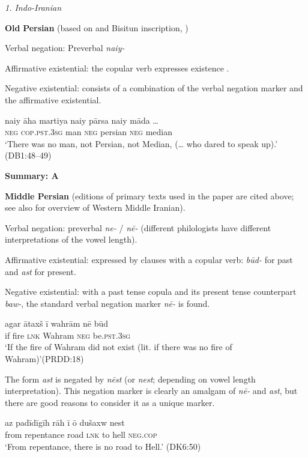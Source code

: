 ﻿\documentclass[output=paper]{langsci/langscibook}
\begin{document}
\begin{unindented}
\textit{1. Indo-Iranian}

\textbf{Old} \textbf{Persian} (based on \citealt{Skjarvo2009b} and Bisitun inscription, \citealt{Schmitt1991})

Verbal negation: Preverbal \textit{naiy-}

Affirmative existential: the copular verb expresses existence \citep[134]{Skjærvø2009b}.

Negative existential: consists of a combination of the verbal negation
marker and the affirmative existential.
%
\begin{exe}\ex
    \gll naiy āha martiya   naiy  pārsa   naiy māda … \\
\textsc{neg} \textsc{cop.pst.3sg} man \textsc{neg} persian  \textsc{neg} median \\
    \glt `There was no man, not Persian, not Median, (… who dared to speak up).' (DB1:48--49)
    \end{exe}
%
\textbf{Summary: A}

\textbf{Middle Persian} (editions of primary texts used in the paper are cited above; see also \citet{Skjærvø2009a} for overview of Western Middle Iranian).

Verbal negation: preverbal \textit{ne-} / \textit{nē-} (different philologists have different interpretations of the vowel length). 

Affirmative existential: expressed by clauses with a copular verb: \textit{būd-} for past and \textit{ast} for present.

Negative existential: with a past tense copula and its present tense counterpart \textit{baw-}, the standard verbal negation marker \textit{nē-} is found.
%
\begin{exe}\ex
    \gll agar ātaxš ī        wahrām  nē     būd \\
if      fire    \textsc{lnk}   Wahram \textsc{neg}  be.\textsc{pst.3sg} \\
    \glt `If the fire of Wahram did not exist (lit. if there was no fire of Wahram)'(PRDD:18)
    \end{exe}

The form \textit{ast} is negated by \textit{nēst} (or \textit{nest}; depending on vowel length interpretation). This negation marker is clearly an amalgam of \textit{nē-} and \textit{ast}, but there are good reasons to consider it as a unique marker.
%
\begin{exe}\ex
    \gll az      padīdīgīh   rāh  ī        ō dušaxw nest \\
from repentance road \textsc{lnk}   to hell      \textsc{neg.cop} \\
    \glt `From repentance, there is no road to Hell.' (DK6:50)
    \end{exe}


\end{unindented}
\end{document}
